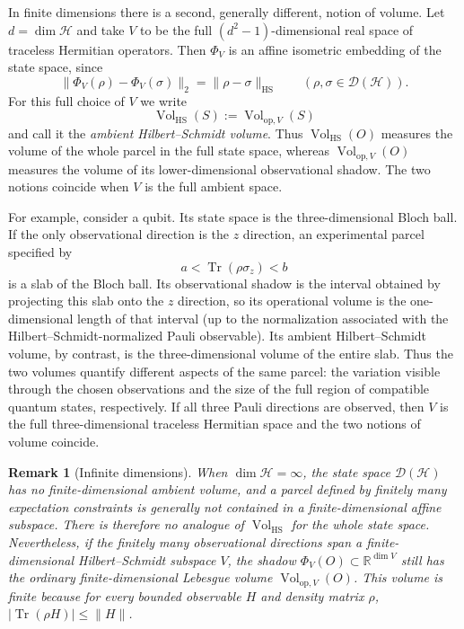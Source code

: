 \documentclass[11pt, onecolumn]{article}
\newtheorem{remark}{Remark}
\begin{document}
In finite dimensions there is a second, generally different, notion of
volume. Let $d=\dim\mathcal H$ and take $V$ to be the full
$(d^2-1)$-dimensional real space of traceless Hermitian operators. Then
$\Phi_V$ is an affine isometric embedding of the state space, since
\[
\|\Phi_V(\rho)-\Phi_V(\sigma)\|_2
=
\|\rho-\sigma\|_{\mathrm{HS}}
\qquad
(\rho,\sigma\in\mathcal D(\mathcal H)).
\]
For this full choice of $V$ we write
\[
\operatorname{Vol}_{\mathrm{HS}}(S)
:=
\operatorname{Vol}_{\mathrm{op},V}(S)
\]
and call it the \emph{ambient Hilbert--Schmidt volume}. Thus
$\operatorname{Vol}_{\mathrm{HS}}(O)$ measures the volume of the whole
parcel in the full state space, whereas
$\operatorname{Vol}_{\mathrm{op},V}(O)$ measures the volume of its
lower-dimensional observational shadow. The two notions coincide when
$V$ is the full ambient space.

For example, consider a qubit. Its state space is the
three-dimensional Bloch ball. If the only observational direction is
the $z$ direction, an experimental parcel specified by
\[
a<\operatorname{Tr}(\rho\sigma_z)<b
\]
is a slab of the Bloch ball. Its observational shadow is the interval
obtained by projecting this slab onto the $z$ direction, so its
operational volume is the one-dimensional length of that interval
(up to the normalization associated with the
Hilbert--Schmidt-normalized Pauli observable). Its ambient
Hilbert--Schmidt volume, by contrast, is the three-dimensional volume
of the entire slab. Thus the two volumes quantify different aspects of
the same parcel: the variation visible through the chosen observations
and the size of the full region of compatible quantum states,
respectively. If all three Pauli directions are observed, then $V$ is
the full three-dimensional traceless Hermitian space and the two
notions of volume coincide.

\begin{remark}[Infinite dimensions]
\label{rem:volume-finite-infinite}
When $\dim\mathcal H=\infty$, the state space
$\mathcal D(\mathcal H)$ has no finite-dimensional ambient volume, and
a parcel defined by finitely many expectation constraints is generally
not contained in a finite-dimensional affine subspace. There is
therefore no analogue of $\operatorname{Vol}_{\mathrm{HS}}$ for the
whole state space. Nevertheless, if the finitely many observational
directions span a finite-dimensional Hilbert--Schmidt subspace $V$,
the shadow $\Phi_V(O)\subset\mathbb R^{\dim V}$ still has the ordinary
finite-dimensional Lebesgue volume
$\operatorname{Vol}_{\mathrm{op},V}(O)$. This volume is finite because
for every bounded observable $H$ and density matrix $\rho$,
$|\operatorname{Tr}(\rho H)|\leq\|H\|$.
\end{remark}
\end{document}
